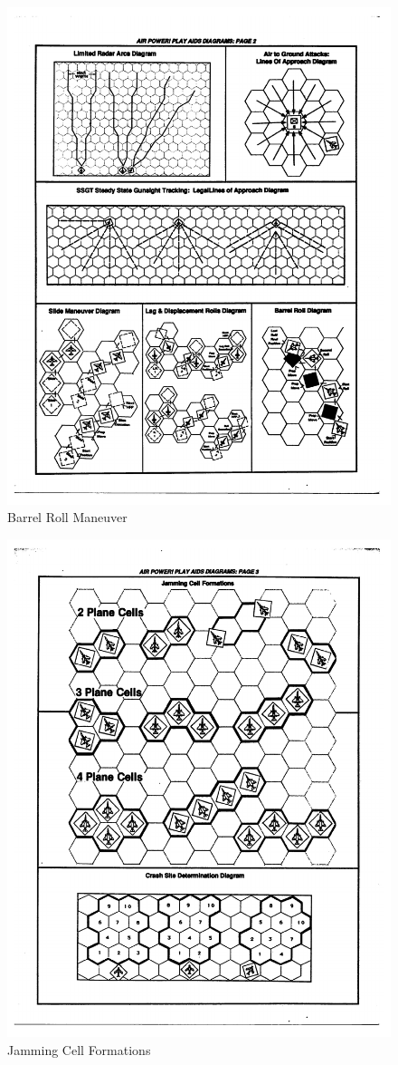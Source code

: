 \documentclass[10pt]{article}
\begin{document}
\begin{figure}
\centering
\caption{Barrel Roll Maneuver}
\medskip
\includegraphics[width=0.6\linewidth]{figures/aids-barrel-roll.pdf}
\end{figure}

\begin{figure}
\centering
\caption{Jamming Cell Formations}
\medskip
\includegraphics[width=0.6\linewidth]{figures/aids-jamming-cells.pdf}
\end{figure}
\end{document}
